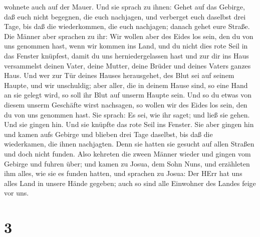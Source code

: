 wohnete auch auf der Mauer.  Und sie sprach zu ihnen: Gehet
auf das Gebirge, daß euch nicht begegnen, die euch nachjagen, und
verberget euch daselbst drei Tage, bis daß die wiederkommen, die euch
nachjagen; danach gehet eure Straße.  Die Männer aber
sprachen zu ihr: Wir wollen aber des Eides los sein, den du von uns
genommen hast,  wenn wir kommen ins Land, und du nicht dies
rote Seil in das Fenster knüpfest, damit du uns herniedergelassen hast
und zur dir ins Haus versammelst deinen Vater, deine Mutter, deine
Brüder und deines Vaters ganzes Haus.  Und wer zur Tür
deines Hauses herausgehet, des Blut sei auf seinem Haupte, und wir
unschuldig; aber aller, die in deinem Hause sind, so eine Hand an sie
gelegt wird, so soll ihr Blut auf unserm Haupte sein.  Und
so du etwas von diesem unserm Geschäfte wirst nachsagen, so wollen wir
des Eides los sein, den du von uns genommen hast.  Sie
sprach: Es sei, wie ihr saget; und ließ sie gehen. Und sie gingen hin.
Und sie knüpfte das rote Seil ins Fenster.  Sie aber gingen
hin und kamen aufs Gebirge und blieben drei Tage daselbst, bis daß die
wiederkamen, die ihnen nachjagten. Denn sie hatten sie gesucht auf allen
Straßen und doch nicht funden.  Also kehreten die zween
Männer wieder und gingen vom Gebirge und fuhren über; und kamen zu
Josua, dem Sohn Nuns, und erzähleten ihm alles, wie sie es funden
hatten,  und sprachen zu Josua: Der HErr hat uns alles Land
in unsere Hände gegeben; auch so sind alle Einwohner des Landes feige
vor uns.

\hypertarget{section-2}{%
\section{3}\label{section-2}}

